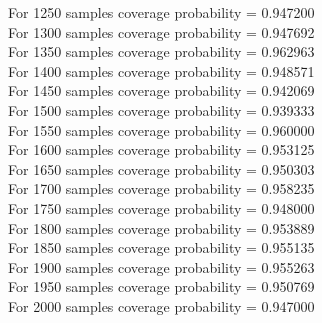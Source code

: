 \documentclass{article}
\begin{document}
For 1250 samples coverage probability = 0.947200\\
For 1300 samples coverage probability = 0.947692\\
For 1350 samples coverage probability = 0.962963\\
For 1400 samples coverage probability = 0.948571\\
For 1450 samples coverage probability = 0.942069\\
For 1500 samples coverage probability = 0.939333\\
For 1550 samples coverage probability = 0.960000\\
For 1600 samples coverage probability = 0.953125\\
For 1650 samples coverage probability = 0.950303\\
For 1700 samples coverage probability = 0.958235\\
For 1750 samples coverage probability = 0.948000\\
For 1800 samples coverage probability = 0.953889\\
For 1850 samples coverage probability = 0.955135\\
For 1900 samples coverage probability = 0.955263\\
For 1950 samples coverage probability = 0.950769\\
For 2000 samples coverage probability = 0.947000\\
\end{document}
